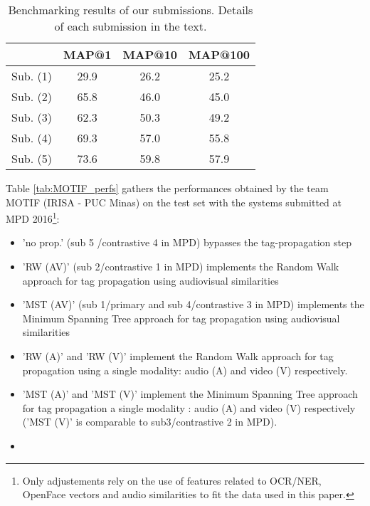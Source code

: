 \begin{table}[tb]
\centering
\begin{tabular}{c|c|c|c|}
\cline{2-4}
                                & MAP@1  & MAP@10 & MAP@100  \\ \hline
 \multicolumn{1}{|c|}{Sub. (1)} & 29.9   & 26.2   & 25.2 \\ \hline
 \multicolumn{1}{|c|}{Sub. (2)} & 65.8   & 46.0   & 45.0 \\ \hline
 \multicolumn{1}{|c|}{Sub. (3)} & 62.3   & 50.3   & 49.2 \\ \hline
 \multicolumn{1}{|c|}{Sub. (4)} & 69.3   & 57.0   & 55.8 \\ \hline
 \multicolumn{1}{|c|}{Sub. (5)} & 73.6   & 59.8   & 57.9 \\ \hline

\end{tabular}
\vspace*{-2mm}
\caption{Benchmarking results of our submissions. Details of each submission in the text.}
\vspace*{-2mm}
\label{tab:mediaeval}
\end{table}



Table \ref{tab:MOTIF_perfs} gathers the performances obtained by the team MOTIF (IRISA - PUC Minas) on the test set with the systems submitted at MPD 2016\footnote{Only adjustements rely on the use of features related to OCR/NER, OpenFace vectors and audio similarities to fit the data used in this paper.}:
\begin{itemize}
  \item 'no prop.' (sub 5 /contrastive 4 in MPD) bypasses the tag-propagation step
  \item 'RW (AV)' (sub 2/contrastive 1 in MPD) implements the Random Walk approach for tag propagation using audiovisual similarities
  \item 'MST (AV)' (sub 1/primary and sub 4/contrastive 3 in MPD) implements the Minimum Spanning Tree approach for tag propagation using audiovisual similarities
  \item 'RW (A)' and  'RW (V)' implement the Random Walk approach for tag propagation using a single modality: audio (A) and video (V) respectively.
  \item 'MST (A)' and  'MST (V)' implement the Minimum Spanning Tree approach for tag propagation a single modality : audio (A) and video (V) respectively ('MST (V)' is comparable to sub3/contrastive 2 in MPD).
  \item 
\end{itemize}

